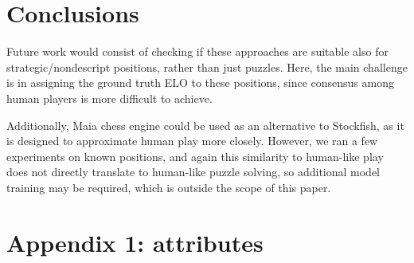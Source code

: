 \documentclass[sigconf,nonacm]{acmart}
\begin{document}
\section{Conclusions}

Future work would consist of checking if these approaches are suitable also for strategic/nondescript positions, rather than just puzzles. Here, the main challenge is in assigning the ground truth ELO to these positions, since consensus among human players is more difficult to achieve. 

Additionally, Maia chess engine \cite{maia1} \cite{maia2} could be used as an alternative to Stockfish, as it is designed to approximate human play more closely. However, we ran a few experiments on known positions, and again this similarity to human-like play does not directly translate to human-like puzzle solving, so additional model training may be required, which is outside the scope of this paper. 




\appendix

\section*{Appendix 1: attributes}
\label{app1}
\end{document}
